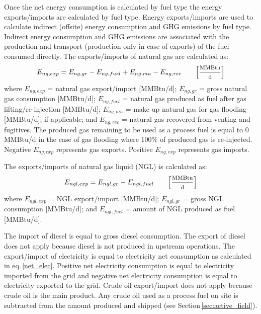 \documentclass[11pt]{report}
\newcommand{\marg}[1]{{\footnotesize\textit{\textcolor{stanford}{'#1'}}}}
\newcommand{\marginnote}[1]{\marginpar{\marg{#1}}}
\begin{document}
Once the \marginnote{Energy \\ Consumption \\ Table 3} net energy consumption is calculated by fuel type the energy exports/imports are calculated by fuel type. Energy exports/imports are used to calculate indirect (offsite) energy consumption and GHG emissions by fuel type. Indirect energy consumption and GHG emissions are associated with the production and transport (production only in case of exports) of the fuel consumed directly. The exports/imports of natural gas are calculated as: 
\begin{equation}
E_{ng,exp} = E_{ng,gr} - E_{ng,fuel} + E_{ng,mu} - E_{ng,rec} \quad\quad\footnotesize{\left[\frac{\text{MMBtu}}{\text{d}}\right]}
\end{equation}
where $E_{ng,exp}$ = natural gas export/import [MMBtu/d]; $E_{ng,gr}$ = gross natural gas consumption [MMBtu/d]; $E_{ng,fuel}$ = natural gas produced as fuel after gas lifting/re-injection [MMBtu/d]; $E_{ng,mu}$ = make up natural gas for gas flooding [MMBtu/d], if applicable; and $E_{ng,rec}$ = natural gas recovered from venting and fugitives. The produced gas remaining to be used as a process fuel is equal to 0 MMBtu/d in the case of gas flooding where 100\% of produced gas is re-injected. Negative $E_{ng,exp}$ represents gas exports. Positive $E_{ng,exp}$ represents gas imports.

The exports/imports of natural gas liquid (NGL) is calculated as:
\begin{equation}
E_{ngl,exp} = E_{ngl,gr} - E_{ngl,fuel} \quad\quad\footnotesize{\left[\frac{\text{MMBtu}}{\text{d}}\right]}
\end{equation}
where $E_{ngl,exp}$ = NGL export/import [MMBtu/d]; $E_{ngl,gr}$ = gross NGL consumption [MMBtu/d]; and $E_{ngl,fuel}$ = amount of NGL produced as fuel [MMBtu/d]. 

The import of diesel is equal to gross diesel consumption. The export of diesel does not apply because diesel is not produced in upstream operations. The export/import of electricity is equal to electricity net consumption as calculated in eq.\,\eqref{net_elec}. Positive net electricity consumption is equal to electricity imported from the grid and negative net electricity consumption is equal to electricity exported to the grid. Crude oil export/import does not apply because crude oil is the main product. Any crude oil used as a process fuel on site is subtracted from the amount produced and shipped (see Section\,\ref{sec:active_field}).
\end{document}
